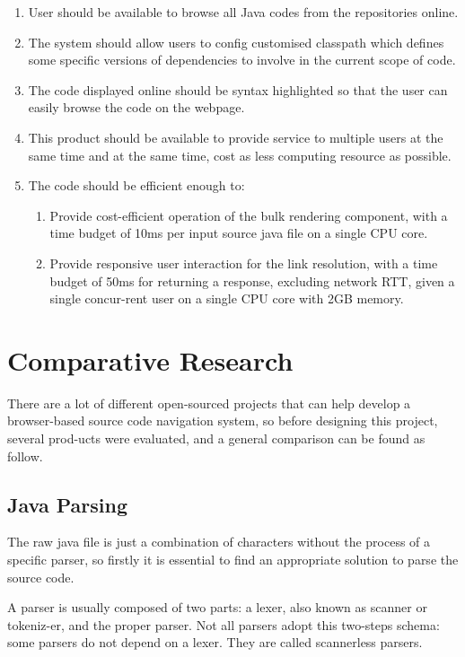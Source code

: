 \documentclass[runningheads]{llncs}
\begin{document}
\begin{enumerate}
	\item User should be available to browse all Java codes from the repositories online.
	\item The system should allow users to config customised classpath which defines some specific versions of dependencies to involve in the current scope of code. 
	\item The code displayed online should be syntax highlighted so that the user can easily browse the code on the webpage.
	\item This product should be available to provide service to multiple users at the same time and at the same time, cost as less computing resource as possible.
	\item The code should be efficient enough to: 
	\begin{enumerate}
		\item Provide cost-efficient operation of the bulk rendering component, with a time budget of 10ms per input source java file on a single CPU core.
		\item Provide responsive user interaction for the link resolution, with a time budget of 50ms for returning a response, excluding network RTT, given a single concur-rent user on a single CPU core with 2GB memory.
	\end{enumerate}
\end{enumerate}


\section{Comparative Research}

There are a lot of different open-sourced projects that can help develop a browser-based source code navigation system, so before designing this project, several prod-ucts were evaluated, and a general comparison can be found as follow.

\subsection{Java Parsing}

The raw java file is just a combination of characters without the process of a specific parser, so firstly it is essential to find an appropriate solution to parse the source code. 

A parser is usually composed of two parts: a lexer, also known as scanner or tokeniz-er, and the proper parser. Not all parsers adopt this two-steps schema: some parsers do not depend on a lexer. They are called scannerless parsers.\cite{parsing-in-java}
\end{document}
